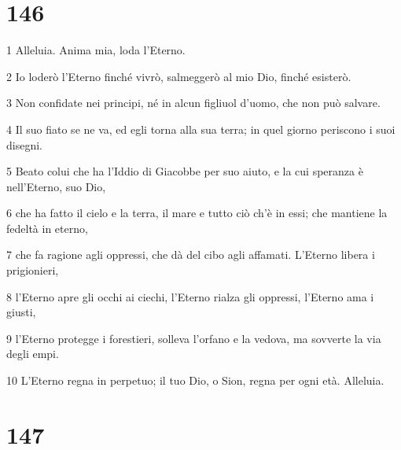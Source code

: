 \chapter{146}

\par 1 Alleluia. Anima mia, loda l'Eterno.
\par 2 Io loderò l'Eterno finché vivrò, salmeggerò al mio Dio, finché esisterò.
\par 3 Non confidate nei principi, né in alcun figliuol d'uomo, che non può salvare.
\par 4 Il suo fiato se ne va, ed egli torna alla sua terra; in quel giorno periscono i suoi disegni.
\par 5 Beato colui che ha l'Iddio di Giacobbe per suo aiuto, e la cui speranza è nell'Eterno, suo Dio,
\par 6 che ha fatto il cielo e la terra, il mare e tutto ciò ch'è in essi; che mantiene la fedeltà in eterno,
\par 7 che fa ragione agli oppressi, che dà del cibo agli affamati. L'Eterno libera i prigionieri,
\par 8 l'Eterno apre gli occhi ai ciechi, l'Eterno rialza gli oppressi, l'Eterno ama i giusti,
\par 9 l'Eterno protegge i forestieri, solleva l'orfano e la vedova, ma sovverte la via degli empi.
\par 10 L'Eterno regna in perpetuo; il tuo Dio, o Sion, regna per ogni età. Alleluia.

\chapter{147}

